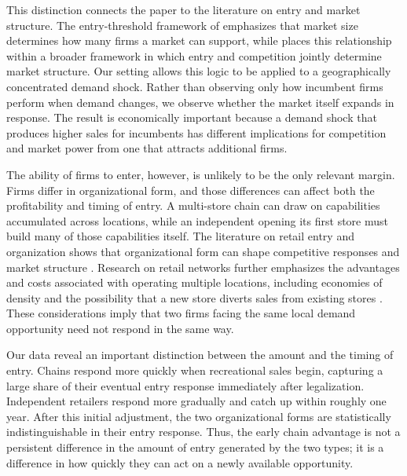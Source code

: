 \documentclass[english,12pt]{article}
\begin{document}
This distinction connects the paper to the literature on entry and market structure. The entry-threshold framework of \citet{BresnahanReiss1990,BresnahanReiss1991} emphasizes that market size determines how many firms a market can support, while \citet{BerryReiss2007} places this relationship within a broader framework in which entry and competition jointly determine market structure. Our setting allows this logic to be applied to a geographically concentrated demand shock. Rather than observing only how incumbent firms perform when demand changes, we observe whether the market itself expands in response. The result is economically important because a demand shock that produces higher sales for incumbents has different implications for competition and market power from one that attracts additional firms.

The ability of firms to enter, however, is unlikely to be the only relevant margin. Firms differ in organizational form, and those differences can affect both the profitability and timing of entry. A multi-store chain can draw on capabilities accumulated across locations, while an independent opening its first store must build many of those capabilities itself. The literature on retail entry and organization shows that organizational form can shape competitive responses and market structure \citep{Mazzeo2002,Seim2006,AdamsEtAl2018,Sadun2015}. Research on retail networks further emphasizes the advantages and costs associated with operating multiple locations, including economies of density and the possibility that a new store diverts sales from existing stores \citep{Nishida2008,Holmes2011,Jia2008}. These considerations imply that two firms facing the same local demand opportunity need not respond in the same way.

Our data reveal an important distinction between the amount and the timing of entry. Chains respond more quickly when recreational sales begin, capturing a large share of their eventual entry response immediately after legalization. Independent retailers respond more gradually and catch up within roughly one year. After this initial adjustment, the two organizational forms are statistically indistinguishable in their entry response. Thus, the early chain advantage is not a persistent difference in the amount of entry generated by the two types; it is a difference in how quickly they can act on a newly available opportunity.
\end{document}
